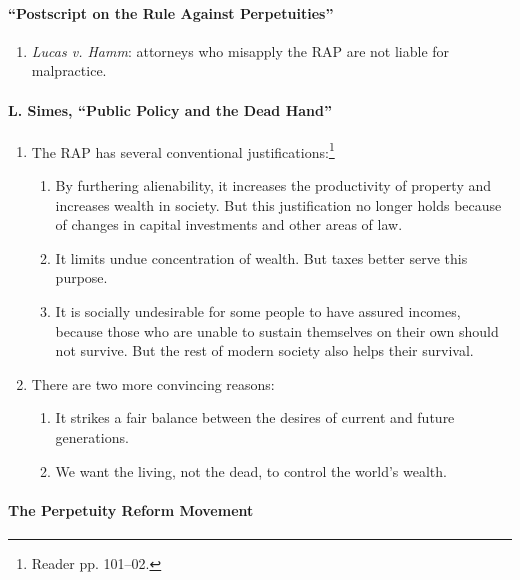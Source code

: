 \paragraph{``Postscript on the Rule Against Perpetuities''}

\begin{enumerate}
    \item \emph{Lucas v. Hamm}: attorneys who misapply the RAP are not liable 
    for malpractice.
\end{enumerate}

\paragraph{L. Simes, ``Public Policy and the Dead Hand''}

\begin{enumerate}
    \item The RAP has several conventional justifications:\footnote{Reader pp. 
    101--02.}
    \begin{enumerate}
        \item By furthering alienability, it increases the productivity of 
        property and increases wealth in society. But this justification no 
        longer holds because of changes in capital investments and other areas 
        of law.
        \item It limits undue concentration of wealth. But taxes better serve 
        this purpose.
        \item It is socially undesirable for some people to have assured 
        incomes, because those who are unable to sustain themselves on their 
        own should not survive. But the rest of modern society also helps 
        their survival.
    \end{enumerate}
    \item There are two more convincing reasons:
    \begin{enumerate}
        \item It strikes a fair balance between the desires of current and 
        future generations.
        \item We want the living, not the dead, to control the world's wealth.
    \end{enumerate}
\end{enumerate}

\paragraph{The Perpetuity Reform Movement}

